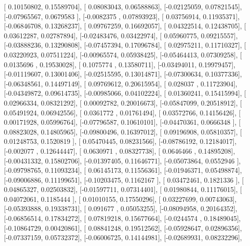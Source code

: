 \documentclass{article}
\begin{document}
       [ 0.10150802,  0.15589704],
       [ 0.08083043,  0.06588863],
       [-0.02125059,  0.07821545],
       [-0.07965567,  0.0679583 ],
       [-0.0082375 ,  0.07893923],
       [ 0.03756914,  0.11935371],
       [-0.06846708,  0.13268237],
       [ 0.09767259,  0.16692057],
       [ 0.04322514,  0.12438705],
       [ 0.03612287,  0.02787894],
       [-0.02483476,  0.03422974],
       [ 0.05960775,  0.09215557],
       [-0.03888236,  0.13290808],
       [-0.07457394,  0.17096784],
       [ 0.02975211,  0.11710327],
       [ 0.03220923,  0.07511224],
       [-0.00965574,  0.05938425],
       [-0.05464413,  0.07309258],
       [ 0.0135696 ,  0.19530028],
       [ 0.1075774 ,  0.13580711],
       [-0.03494011,  0.19979457],
       [-0.01119607,  0.13001406],
       [-0.02515595,  0.13014871],
       [-0.07300634,  0.10377336],
       [-0.06348561,  0.14497149],
       [ 0.09769612,  0.20615954],
       [ 0.028037  ,  0.11723904],
       [-0.04349872,  0.09614735],
       [-0.00985066,  0.04102224],
       [ 0.01360241,  0.15415994],
       [ 0.02966334,  0.08321292],
       [ 0.00092782,  0.20016673],
       [-0.05847099,  0.20518912],
       [ 0.05491924,  0.06942556],
       [ 0.0361772 ,  0.01761494],
       [ 0.03572766,  0.14156426],
       [ 0.00171928,  0.05996764],
       [-0.07796587,  0.10610101],
       [-0.04470361,  0.0666348 ],
       [ 0.08823028,  0.14805965],
       [-0.09800496,  0.16397012],
       [ 0.09196908,  0.05810357],
       [ 0.01248753,  0.1520819 ],
       [ 0.05470445,  0.08231566],
       [-0.08786192,  0.12184017],
       [-0.002077  ,  0.12644447],
       [ 0.0630971 ,  0.08327738],
       [ 0.0646466 ,  0.14895208],
       [-0.00431332,  0.15802706],
       [-0.01397405,  0.11646771],
       [-0.05073864,  0.0552946 ],
       [-0.09798765,  0.11093234],
       [ 0.06145173,  0.11556361],
       [-0.01946371,  0.05498874],
       [-0.09006886,  0.11199651],
       [-0.10203475,  0.1162167 ],
       [ 0.03472461,  0.1821336 ],
       [ 0.04865327,  0.02503832],
       [-0.01597711,  0.07314401],
       [ 0.01980844,  0.11176015],
       [ 0.04072061,  0.1185444 ],
       [ 0.01010155,  0.17550296],
       [ 0.03227699,  0.00743063],
       [-0.05393888,  0.19338731],
       [ 0.091677  ,  0.05053255],
       [-0.08094958,  0.20164352],
       [-0.06856514,  0.17834272],
       [ 0.07819218,  0.15677664],
       [-0.0244574 ,  0.18489045],
       [-0.10864729,  0.00420861],
       [ 0.08841248,  0.19512562],
       [-0.05928647,  0.02896356],
       [-0.07337159,  0.05732372],
       [-0.06006725,  0.14144981],
       [-0.02689931,  0.08232296],
\end{document}
